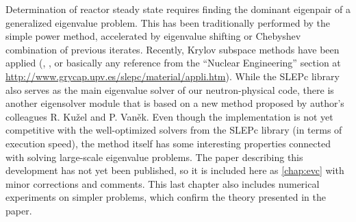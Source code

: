 Determination of reactor steady state requires finding the dominant eigenpair of a generalized eigenvalue problem. This
has been traditionally performed by the simple power method, accelerated by eigenvalue shifting or Chebyshev
combination of previous iterates. Recently, Krylov subspace methods have been applied (\cite{warsa}, \cite{Subramanian},
or basically any reference from the ``Nuclear Engineering'' section at
\url{http://www.grycap.upv.es/slepc/material/appli.htm}). While the SLEPc library also serves as the main eigenvalue
solver of our neutron-physical code, there is another eigensolver module that is based on a new method
proposed by author's colleagues R. Ku{\v z}el and P. Van{\v e}k. Even though the implementation is not yet competitive with the well-optimized
solvers from the SLEPc library (in terms of execution speed), the method itself has some interesting properties
connected with solving large-scale eigenvalue problems. The paper describing this development has not yet been 
published, so it is included here as \cref{chap:evc} with minor corrections and comments. This last chapter also
includes numerical experiments on simpler problems, which confirm the theory presented in the paper.

